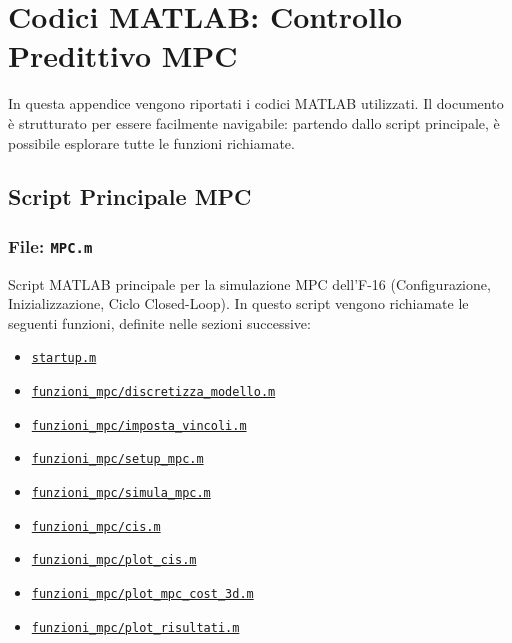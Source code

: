 \chapter{Codici MATLAB: Controllo Predittivo MPC}

In questa appendice vengono riportati i codici MATLAB utilizzati. Il documento è strutturato per essere facilmente navigabile: partendo dallo script principale, è possibile esplorare tutte le funzioni richiamate.

\section*{Script Principale MPC}
\subsection*{File: \texttt{MPC.m}}
\label{sec:MPC}

Script MATLAB principale per la simulazione MPC dell'F-16 (Configurazione, Inizializzazione, Ciclo Closed-Loop). In questo script vengono richiamate le seguenti funzioni, definite nelle sezioni successive:
\begin{itemize}
    \item \hyperref[sec:startup]{\texttt{startup.m}}
    \item \hyperref[sec:funzioni_mpc_discretizza_modello]{\texttt{funzioni\_mpc/discretizza\_modello.m}}
    \item \hyperref[sec:funzioni_mpc_imposta_vincoli]{\texttt{funzioni\_mpc/imposta\_vincoli.m}}
    \item \hyperref[sec:funzioni_mpc_setup_mpc]{\texttt{funzioni\_mpc/setup\_mpc.m}}
    \item \hyperref[sec:funzioni_mpc_simula_mpc]{\texttt{funzioni\_mpc/simula\_mpc.m}}
    \item \hyperref[sec:funzioni_mpc_cis]{\texttt{funzioni\_mpc/cis.m}}
    \item \hyperref[sec:funzioni_mpc_plot_cis]{\texttt{funzioni\_mpc/plot\_cis.m}}
    \item \hyperref[sec:funzioni_mpc_plot_mpc_cost_3d]{\texttt{funzioni\_mpc/plot\_mpc\_cost\_3d.m}}
    \item \hyperref[sec:funzioni_mpc_plot_risultati]{\texttt{funzioni\_mpc/plot\_risultati.m}}
\end{itemize}

